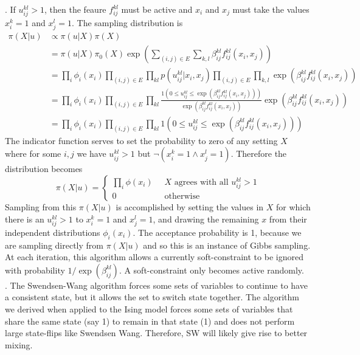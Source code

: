 \documentclass[11pt]{article}
\begin{document}
. If $u_{ij}^{kl} > 1$, then the feaure $f_{ij}^{kl}$ must be active and $x_i$ and $x_j$ must take the values $x_i^k = 1$ and $x_j^l = 1$. The sampling distribution is
\begin{align}
  \pi(X | u) &\propto \pi(u | X) \pi(X)\\ 
  &= \pi(u | X) \pi_0(X) \exp\left( \sum_{(i,j) \in E} \sum_{k,l} \beta_{ij}^{kl} f_{ij}^{kl}(x_i,x_j) \right)\\
  &= \prod_i \phi_i(x_i) \prod_{(i,j) \in E} \prod_{kl} p(u_{ij}^{kl} | x_i, x_j) \prod_{(i,j) \in E} \prod_{k,l} \exp\left( \beta_{ij}^{kl} f_{ij}^{kl}(x_i,x_j) \right)\\
  &= \prod_i \phi_i(x_i) \prod_{(i,j) \in E} \prod_{kl} \frac{1\left( 0 \le u_{ij}^{kl} \le \exp\left( \beta_{ij}^{kl} f_{ij}^{kl}(x_i,x_j) \right) \right)}{\exp\left(\beta_{ij}^{kl} f_{ij}^{kl}(x_i,x_j) \right)} \exp\left( \beta_{ij}^{kl} f_{ij}^{kl}(x_i,x_j) \right)\\
  &= \prod_i \phi_i(x_i) \prod_{(i,j) \in E} \prod_{kl} 1\left( 0 \le u_{ij}^{kl} \le \exp\left( \beta_{ij}^{kl} f_{ij}^{kl}(x_i,x_j) \right) \right)
\end{align}
The indicator function serves to set the probability to zero of any setting $X$ where for some $i,j$ we have  $u_{ij}^{kl} > 1$ but $\lnot(x_i^k = 1 \land x_j^l = 1) $. Therefore the distribution becomes
\[ \pi(X | u) = \left\{
  \begin{array}{cl}
    \prod_i \phi(x_i) & \;\; X \mbox{ agrees with all } u_{ij}^{kl} > 1\\
    0 & \;\; \mbox{otherwise}
  \end{array}
\right.
\]
Sampling from this $\pi(X | u)$ is accomplished by setting the values in $X$ for which there is an $u_{ij}^{kl} > 1$ to $x_i^k = 1$ and $x_j^l = 1$, and drawing the remaining $x$ from their independent distributions $\phi_i(x_i)$. The acceptance probability is 1, because we are sampling directly from $\pi(X | u)$ and so this is an instance of Gibbs sampling. At each iteration, this algorithm allows a currently soft-constraint to be ignored with probability $1/\exp(\beta_{ij}^{kl})$. A soft-constraint only becomes active randomly.\\

. The Swendsen-Wang algorithm forces some sets of variables to continue to have a consistent state, but it allows the set to switch state together. The algorithm we derived when applied to the Ising model forces some sets of variables that share the same state (say 1) to remain in that state (1) and does not perform large state-flips like Swendsen Wang. Therefore, SW will likely give rise to better mixing.
\end{document}
